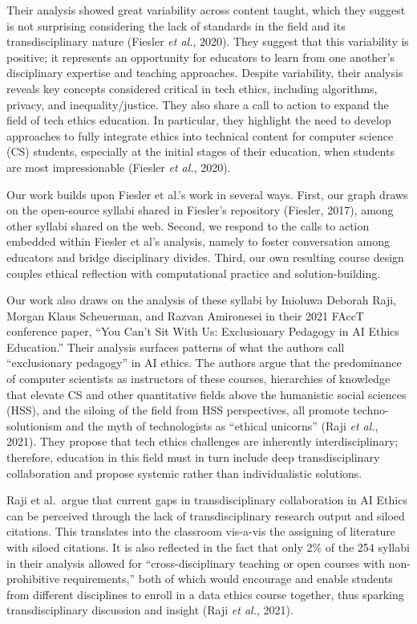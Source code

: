 \documentclass[
]{article}
\begin{document}
Their analysis showed great variability across content taught, which
they suggest is not surprising considering the lack of standards in the
field and its transdisciplinary nature (Fiesler \emph{et al.}, 2020).
They suggest that this variability is positive; it represents an
opportunity for educators to learn from one another's disciplinary
expertise and teaching approaches. Despite variability, their analysis
reveals key concepts considered critical in tech ethics, including
algorithms, privacy, and inequality/justice. They also share a call to
action to expand the field of tech ethics education. In particular, they
highlight the need to develop approaches to fully integrate ethics into
technical content for computer science (CS) students, especially at the
initial stages of their education, when students are most impressionable
(Fiesler \emph{et al.}, 2020).

Our work builds upon Fiesler et al.'s work in several ways. First, our
graph draws on the open-source syllabi shared in Fiesler's repository
(Fiesler, 2017), among other syllabi shared on the web. Second, we
respond to the calls to action embedded within Fiesler et al's analysis,
namely to foster conversation among educators and bridge disciplinary
divides. Third, our own resulting course design couples ethical
reflection with computational practice and solution-building.

Our work also draws on the analysis of these syllabi by Inioluwa Deborah
Raji, Morgan Klaus Scheuerman, and Razvan Amironesei in their 2021 FAccT
conference paper, ``You Can't Sit With Us: Exclusionary Pedagogy in AI
Ethics Education.'' Their analysis surfaces patterns of what the authors
call ``exclusionary pedagogy'' in AI ethics. The authors argue that the
predominance of computer scientists as instructors of these courses,
hierarchies of knowledge that elevate CS and other quantitative fields
above the humanistic social sciences (HSS), and the siloing of the field
from HSS perspectives, all promote techno-solutionism and the myth of
technologists as ``ethical unicorns'' (Raji \emph{et al.}, 2021). They
propose that tech ethics challenges are inherently interdisciplinary;
therefore, education in this field must in turn include deep
transdisciplinary collaboration and propose systemic rather than
individualistic solutions.

Raji et al.~argue that current gaps in transdisciplinary collaboration
in AI Ethics can be perceived through the lack of transdisciplinary
research output and siloed citations. This translates into the classroom
vis-a-vis the assigning of literature with siloed citations. It is also
reflected in the fact that only 2\% of the 254 syllabi in their analysis
allowed for ``cross-disciplinary teaching or open courses with
non-prohibitive requirements,'' both of which would encourage and enable
students from different disciplines to enroll in a data ethics course
together, thus sparking transdisciplinary discussion and insight (Raji
\emph{et al.}, 2021).
\end{document}
